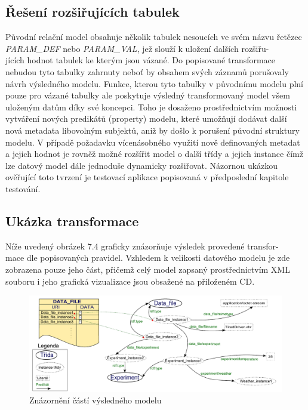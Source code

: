 \documentclass{projekt}
\begin{document}
\subsection{Řešení rozšiřujících tabulek}
\hspace{0.65cm}Původní relační model obsahuje několik tabulek nesoucích ve svém názvu řetězec {\it PARAM\_DEF} nebo {\it PARAM\_VAL}, jež slouží k uložení dalších rozšiřu-\\jících hodnot tabulek ke kterým jsou vázané. Do popisované transformace nebudou tyto tabulky zahrnuty neboť by obsahem svých záznamů porušovaly návrh výsledného modelu. Funkce, kterou tyto tabulky v původnímu modelu plní pouze pro vázané tabulky ale poskytuje výsledný transformovaný model všem uloženým datům díky své koncepci. Toho je dosaženo prostřednictvím možnosti vytváření nových predikátů (property) modelu, které umožňují dodávat další nová metadata libovolným subjektů, aniž by došlo k porušení původní struktury modelu. V případě požadavku vícenásobného využití nově definovaných metadat a jejich hodnot je rovněž možné rozšířit model o další třídy a jejich instance čímž lze datový model dále jednoduše dynamicky rozšiřovat. Názornou ukázkou ověřující toto tvrzení je testovací aplikace popisovaná v předposlední kapitole testování. 

\subsection{Ukázka transformace}
\hspace{0.65cm}Níže uvedený obrázek 7.4 graficky znázorňuje výsledek provedené transfor-\\mace dle popisovaných pravidel. Vzhledem k velikosti datového modelu je zde zobrazena pouze jeho část, přičemž celý model zapsaný prostřednictvím XML souboru i jeho grafická vizualizace jsou obsažené na přiloženém CD.


\begin{figure}[htb]
\begin{center}
\includegraphics[scale=0.53]{vysledne.pdf}
\caption{Znázornění částí výsledného modelu}
\end{center}
\end{figure}
\end{document}
